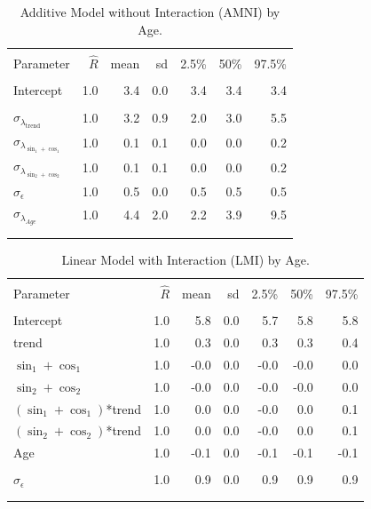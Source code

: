 \documentclass{article}\usepackage[]{graphicx}\usepackage[]{color}
\begin{document}
\begin{table}[bp!]
\caption{Additive Model without Interaction (AMNI) by Age.}
\label{amni_age}
\centering
\begin{tabular}{lrrrrrr}
\\[-1.8ex]\hline 
\hline \\[-1.8ex] 
Parameter & $\hat{R}$  & mean & sd & 2.5\% & 50\% & 97.5\% \\ 
\hline \\[-1.8ex] 
Intercept & 1.0 & 3.4 & 0.0 & 3.4 & 3.4 & 3.4 \\ 
\hline \\[-1.8ex] 
$\sigma_{\lambda_{\text{trend}}}$       & 1.0 & 3.2 & 0.9 & 2.0 & 3.0 & 5.5 \\
$\sigma_{\lambda_{\sin_{1}+\cos_{1}}}$  & 1.0 & 0.1 & 0.1 & 0.0 & 0.0 & 0.2 \\ 
$\sigma_{\lambda_{\sin_{2}+\cos_{2}}}$  & 1.0 & 0.1 & 0.1 & 0.0 & 0.0 & 0.2 \\
$\sigma_{\epsilon}$                    & 1.0 & 0.5 & 0.0 & 0.5 & 0.5 & 0.5 \\
$\sigma_{\lambda_{Age}}$                & 1.0 & 4.4 & 2.0 & 2.2 & 3.9 & 9.5 \\  
\\[-1.8ex]\hline 
\hline \\[-1.8ex] 
\end{tabular}
\end{table}

  
\begin{table}[bp!]
\caption{Linear Model with Interaction (LMI) by Age.}
\label{lmi_age}
\centering
\begin{tabular}{lrrrrrr}
\\[-1.8ex]\hline 
\hline \\[-1.8ex] 
Parameter & $\hat{R}$  & mean & sd & 2.5\% & 50\% & 97.5\% \\ 
\hline \\[-1.8ex] 
Intercept & 1.0 & 5.8 & 0.0 & 5.7 & 5.8 & 5.8 \\ 
trend & 1.0 & 0.3 & 0.0 & 0.3 & 0.3 & 0.4 \\ 
$\sin_{1} + \cos_{1}$ & 1.0 & -0.0 & 0.0 & -0.0 & -0.0 & 0.0 \\ 
$\sin_{2} + \cos_{2}$ & 1.0 & -0.0 & 0.0 & -0.0 & -0.0 & 0.0 \\ 
$(\sin_{1} + \cos_{1})$*trend & 1.0 & 0.0 & 0.0 & -0.0 & 0.0 & 0.1 \\ 
$(\sin_{2} + \cos_{2})$*trend & 1.0 & 0.0 & 0.0 & -0.0 & 0.0 & 0.1 \\ 
Age & 1.0 & -0.1 & 0.0 & -0.1 & -0.1 & -0.1 \\ 
  \hline \\[-1.8ex] 
$\sigma_{\epsilon}$  & 1.0 & 0.9 & 0.0 & 0.9 & 0.9 & 0.9 \\
\\[-1.8ex]\hline 
\hline \\[-1.8ex] 
\end{tabular}
\end{table}
\end{document}
